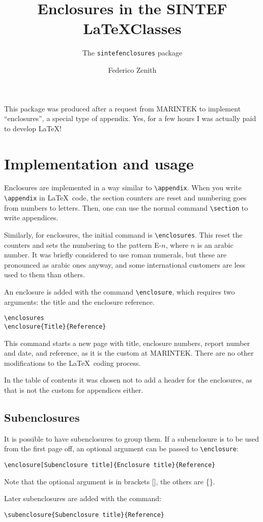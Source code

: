 \documentclass[unrestrictedsummary]{sintefreport}
\title{Enclosures in the SINTEF \LaTeX Classes}
\subtitle{The \texttt{sintefenclosures} package}
\author{Federico Zenith}
\begin{document}
\frontmatter
This package was produced after a request from MARINTEK to implement
``enclosures'', a special type of appendix.
Yes, for a few hours I was actually paid to develop \LaTeX!

\section{Implementation and usage}
Enclosures are implemented in a way similar to \verb|\appendix|.
When you write \verb|\appendix| in \LaTeX\ code, the section counters are reset
and numbering goes from numbers to letters.
Then, one can use the normal command \verb|\section| to write appendices.

Similarly, for enclosures, the initial command is \verb|\enclosures|.
This reset the counters and sets the numbering to the pattern \textsf{E-$n$},
where $n$ is an arabic number.
It was briefly considered to use roman numerals, but these are pronounced as
arabic ones anyway, and some international customers are less used to them than
others.

An enclosure is added with the command \verb|\enclosure|, which requires two
arguments: the title and the enclosure reference.
\begin{verbatim}
\enclosures
\enclosure{Title}{Reference}
\end{verbatim}
This command starts a new page with title, enclosure numbers, report number and
date, and reference, as it is the custom at MARINTEK.
There are no other modifications to the \LaTeX\ coding process.

In the table of contents it was chosen not to add a header for the enclosures,
as that is not the custom for appendices either.

\subsection{Subenclosures}
It is possible to have subenclosures to group them.
If a subenclosure is to be used from the first page off, an optional argument
can be passed to \verb|\enclosure|:
\begin{verbatim}
\enclosure[Subenclosure title]{Enclosure title}{Reference}
\end{verbatim}
Note that the optional argument is in brackets [], the others are \{\}.

Later subenclosures are added with the command:
\begin{verbatim}
\subenclosure{Subenclosure title}{Reference}
\end{verbatim}
\end{document}
